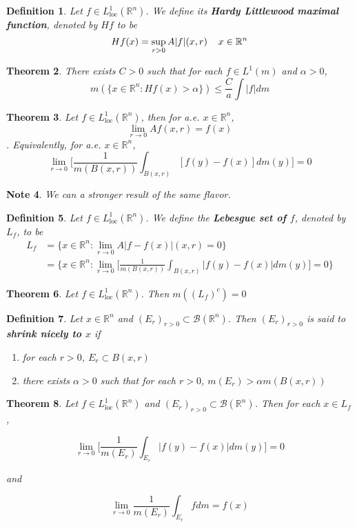 \documentclass[12pt]{amsart}
\newtheorem{thm}{Theorem}[section]
\newtheorem{defn}[thm]{Definition}
\newtheorem{note}[thm]{Note}
\newcommand{\al}{\alpha}
\newcommand{\R}{\mathbb{R}}
\newcommand{\MB}{\mathcal{B}}
\newcommand{\Ll}{L^1_{\text{loc}}(\R^n)}
\begin{document}
\begin{defn}
Let $f \in \Ll$. We define its \textbf{Hardy Littlewood maximal function}, denoted by $Hf$ to be $$Hf(x) = \sup_{r>0} A|f|(x,r) \hspace{4mm} x \in \R^n$$
\end{defn}

\begin{thm}
There exists $C >0$ such that for each $f \in L^1(m)$ and $\al > 0$, $$m(\{x \in \R^n: Hf(x) > \al\}) \leq \frac{C}{a} \int |f|dm$$
\end{thm}

\begin{thm}
Let $f \in \Ll$, then for a.e. $x \in \R^n$, $$\lim_{r \rightarrow 0} Af(x,r) =f(x)$$. Equivalently, for a.e. $x \in \R^n$, $$ \lim_{r \rightarrow 0} \bigg[ \frac{1}{m(B(x,r))}\int_{B(x,r)}[f(y)-f(x)]dm(y)\bigg] =0$$
\end{thm}

\begin{note}
We can a stronger result of the same flavor.
\end{note}

\begin{defn}
Let $f \in \Ll$. We define the \textbf{Lebesgue set of $f$}, denoted by $L_f$, to be 
\begin{align*}
L_f 
&= \{x \in \R^n: \lim_{r \rightarrow 0} A|f-f(x)|(x,r) =0 \}\\
&= \bigg \{x \in \R^n: \lim_{r \rightarrow 0} \bigg[ \frac{1}{m(B(x,r))}\int_{B(x,r)}|f(y) - f(x)|dm(y)\bigg] =0 \bigg \}
\end{align*}
\end{defn}

\begin{thm}
Let $f \in \Ll$. Then $m((L_f)^c) = 0$
\end{thm}

\begin{defn}
Let $x \in \R^n$ and $(E_r)_{r>0} \subset \MB(\R^n)$. Then $(E_r)_{r>0}$ is said to \textbf{shrink nicely to $x$} if 

\begin{enumerate}
\item for each $r>0$, $E_r \subset B(x,r)$
\item there exists $\al >0$ such that for each $r>0$, $m(E_r)> \al m(B(x,r))$
\end{enumerate} 
\end{defn}

\begin{thm}
Let $f \in \Ll$ and $(E_r)_{r>0} \subset \MB(\R^n)$. Then for each $x \in L_f$, 

$$\lim_{r \rightarrow 0} \bigg[ \frac{1}{m(E_r)}\int_{E_r}|f(y) - f(x)|dm(y)\bigg] =0$$

and 

$$\lim_{r \rightarrow 0}  \frac{1}{m(E_r)}\int_{E_r}fdm = f(x)$$
\end{thm}
\end{document}
